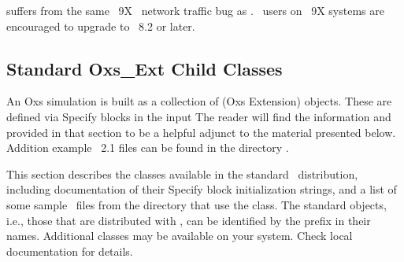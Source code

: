  suffers from the same \Windows~9X \Tcl\ network traffic bug
as .  \OOMMF\ users on \Windows~9X systems are encouraged to
upgrade to \Tcl~8.2 or later.


\subsection{Standard Oxs\_Ext Child Classes}\label{sec:oxsext}%
An Oxs simulation is built as a collection of  (Oxs
Extension) objects.  These are defined via Specify blocks in the input
The reader will find the information and
 provided in that section to be a helpful
adjunct to the material presented below.  Addition example \MIF~2.1
files can be found in the directory .

This section describes the  classes available in the
standard \OOMMF\ distribution, including documentation of their Specify
block initialization strings, and a list of some sample \MIF\ files from
the  directory that use the class.  The
standard  objects, i.e., those that are distributed with
\OOMMF, can be identified by the  prefix in their names.
Additional  classes may be available on your system.  Check
local documentation for details.

